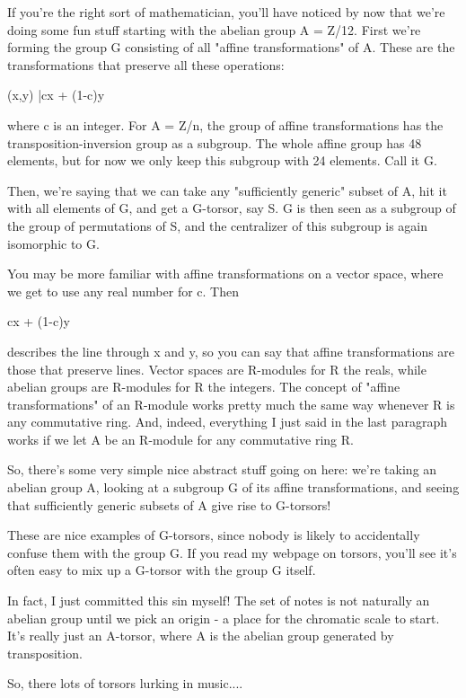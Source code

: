 If you're the right sort of mathematician, you'll have noticed by
now that we're doing some fun stuff starting with the abelian
group A = Z/12.   First we're forming the group G consisting of all
"affine transformations" of A.  These are the transformations that 
preserve all these operations:

(x,y) |\to  cx + (1-c)y                

where c is an integer.   For A = Z/n, the group of affine
transformations has the transposition-inversion group as a
subgroup.  The whole affine group has 48 elements, but for 
now we only keep this subgroup with 24 elements.  Call it G.


Then, we're saying that we can take any "sufficiently generic" 
subset of A, hit it with all elements of G, and get a G-torsor, 
say S.  G is then seen as a subgroup of the group of permutations 
of S, and the centralizer of this subgroup is again isomorphic to 
G.

You may be more familiar with affine transformations on a vector 
space, where we get to use any real number for c.   Then 

cx + (1-c)y       

describes the line through x and y, so you can say that affine 
transformations are those that preserve lines.  Vector spaces are 
R-modules for R the reals, while abelian groups are R-modules for 
R the integers.  The concept of "affine transformations" of an 
R-module works pretty much the same way whenever R is any 
commutative ring.   And, indeed, everything I just said in the last
paragraph works if we let A be an R-module for any commutative ring 
R.   

So, there's some very simple nice abstract stuff going on here:
we're taking an abelian group A, looking at a subgroup G of its
affine transformations, and seeing that sufficiently generic
subsets of A give rise to G-torsors!

These are nice examples of G-torsors, since nobody is likely to 
accidentally confuse them with the group G.  If you read my webpage
on torsors, you'll see it's often easy to mix up a G-torsor with 
the group G itself.

In fact, I just committed this sin myself!   The set of notes is 
not naturally an abelian group until we pick an origin - a place 
for the chromatic scale to start.  It's really just an A-torsor, 
where A is the abelian group generated by transposition.  

So, there lots of torsors lurking in music....

